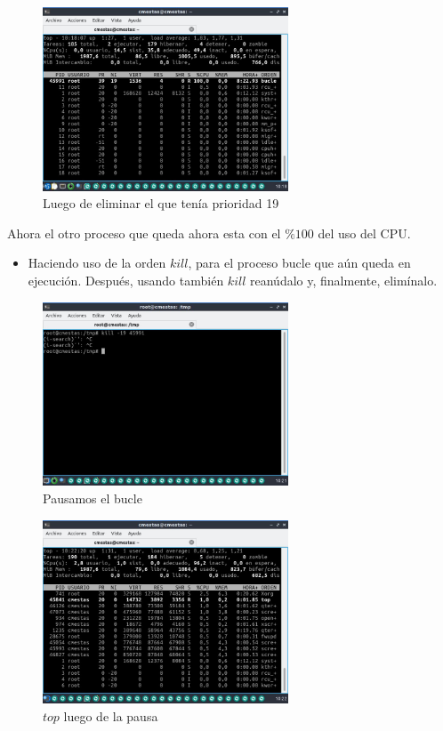 \documentclass[12pt]{article}
\begin{document}
\begin{figure}[h]
    \centering
    \includegraphics[width=0.65\textwidth]{images/screenA29.jpg}
    \caption{Luego de eliminar el que tenía prioridad 19}
\end{figure}

Ahora el otro proceso que queda ahora esta con el $\%100$ del uso del CPU.

\begin{itemize}
    \item Haciendo uso de la orden $kill$, para el proceso bucle que aún queda en ejecución. Después, usando también $kill$ reanúdalo y, finalmente, elimínalo.
\end{itemize}

\begin{figure}[h]
    \centering
    \includegraphics[width=0.65\textwidth]{images/screenA30.jpg}
    \caption{Pausamos el bucle}
\end{figure}

\begin{figure}[h]
    \centering
    \includegraphics[width=0.65\textwidth]{images/screenA31.jpg}
    \caption{$top$ luego de la pausa}
\end{figure}
\end{document}
